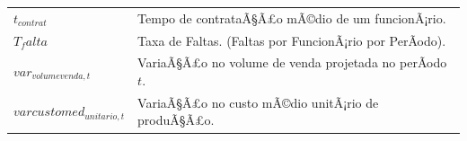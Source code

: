 \documentclass[]{article}
\begin{document}
\begin{longtable}[]{@{}ll@{}}
\begin{minipage}[t]{0.07\columnwidth}
\(t_{contrat}\)\strut
\end{minipage} & \begin{minipage}[t]{0.87\columnwidth}\raggedright\strut
Tempo de contrataÃ§Ã£o mÃ©dio de um funcionÃ¡rio.\strut
\end{minipage}\tabularnewline
\begin{minipage}[t]{0.07\columnwidth}\raggedright\strut
\(T_falta\)\strut
\end{minipage} & \begin{minipage}[t]{0.87\columnwidth}\raggedright\strut
Taxa de Faltas. (Faltas por FuncionÃ¡rio por PerÃ­odo).\strut
\end{minipage}\tabularnewline
\begin{minipage}[t]{0.07\columnwidth}\raggedright\strut
\(var_{volumevenda, t}\)\strut
\end{minipage} & \begin{minipage}[t]{0.87\columnwidth}\raggedright\strut
VariaÃ§Ã£o no volume de venda projetada no perÃ­odo \(t\).\strut
\end{minipage}\tabularnewline
\begin{minipage}[t]{0.07\columnwidth}\raggedright\strut
\(varcustomed_{unitario, t}\)\strut
\end{minipage} & \begin{minipage}[t]{0.87\columnwidth}\raggedright\strut
VariaÃ§Ã£o no custo mÃ©dio unitÃ¡rio de produÃ§Ã£o.\strut
\end{minipage}\tabularnewline
\bottomrule
\end{longtable}
\end{document}
